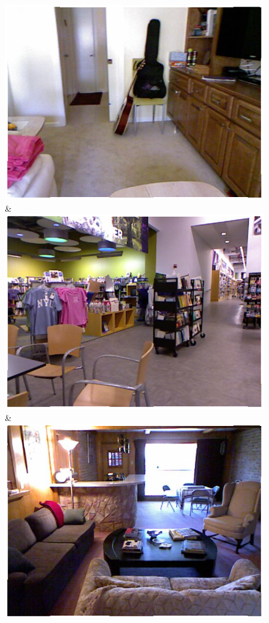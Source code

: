 \begin{figure}
\begin{tabu}
    \includegraphics[width=\linewidth]{nyu/images/01331_image.png}&%
    \includegraphics[width=\linewidth]{nyu/images/00118_image.png}&%
    \includegraphics[width=\linewidth]{nyu/images/01203_image.png}\\
    \vspace{3mm}\\



\end{tabu}
\end{figure}
